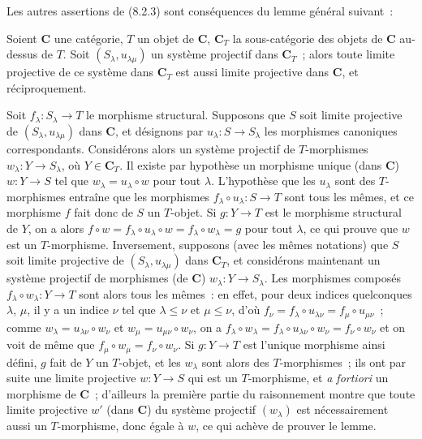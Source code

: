 Les autres assertions de (8.2.3) sont conséquences du lemme général suivant~:

\begin{lemma}[8.2.4]
\label{IV.8.2.4-fr}
Soient $\boldsymbol{C}$ une catégorie, $T$ un objet de $\boldsymbol{C}$,
$\boldsymbol{C}_T$ la sous-catégorie des objets de $\boldsymbol{C}$ au-dessus de $T$.
Soit $(S_\lambda,u_{\lambda\mu})$ un système projectif dans $\boldsymbol{C}_T$~;
alors toute limite projective de ce système dans $\boldsymbol{C}_T$ est aussi
limite projective dans $\boldsymbol{C}$, et réciproquement.
\end{lemma}

Soit $f_\lambda:S_\lambda\to T$ le morphisme structural. Supposons que $S$
soit limite projective de $(S_\lambda,u_{\lambda\mu})$ dans $\boldsymbol{C}$, et
désignons par $u_\lambda:S\to S_\lambda$ les morphismes canoniques
correspondants. Considérons alors un système projectif de $T$-morphismes
$w_\lambda:Y\to S_\lambda$, où $Y\in\boldsymbol{C}_T$. Il existe par hypothèse un
morphisme unique (dans $\boldsymbol{C}$) $w:Y\to S$ tel que
$w_\lambda=u_\lambda\circ w$ pour tout $\lambda$. L'hypothèse que les
$u_\lambda$ sont des $T$-morphismes entraîne que les morphismes
$f_\lambda\circ u_\lambda:S\to T$ sont tous les mêmes, et ce morphisme $f$
fait donc de $S$ un $T$-objet. Si $g:Y\to T$ est le morphisme structural de
$Y$, on a alors
$f\circ w=f_\lambda\circ u_\lambda\circ w=f_\lambda\circ w_\lambda=g$ pour
tout $\lambda$, ce qui prouve que $w$ est un $T$-morphisme. Inversement,
supposons (avec les mêmes notations) que $S$ soit limite projective de
$(S_\lambda,u_{\lambda\mu})$ dans $\boldsymbol{C}_T$, et considérons maintenant un
système projectif de morphismes (de $\boldsymbol{C}$) $w_\lambda:Y\to S_\lambda$.
Les morphismes composés $f_\lambda\circ w_\lambda:Y\to T$ sont alors tous
les mêmes~: en effet, pour deux indices quelconques $\lambda$, $\mu$, il y a
un indice $\nu$ tel que $\lambda\leq\nu$ et $\mu\leq\nu$, d'où
$f_\nu=f_\lambda\circ u_{\lambda\nu}=f_\mu\circ u_{\mu\nu}$~; comme
$w_\lambda=u_{\lambda\nu}\circ w_\nu$ et
$w_\mu=u_{\mu\nu}\circ w_\nu$, on a
$f_\lambda\circ w_\lambda=f_\lambda\circ u_{\lambda\nu}\circ w_\nu
=f_\nu\circ w_\nu$ et on voit de même que
$f_\mu\circ w_\mu=f_\nu\circ w_\nu$. Si $g:Y\to T$ est l'unique morphisme
ainsi défini, $g$ fait de $Y$ un $T$-objet, et les $w_\lambda$ sont alors des
$T$-morphismes~; ils ont par suite une limite projective $w:Y\to S$ qui est
un $T$-morphisme, et \emph{a fortiori} un morphisme de $\boldsymbol{C}$~;
d'ailleurs la première partie du raisonnement montre que toute limite
projective $w'$ (dans $\boldsymbol{C}$) du système projectif $(w_\lambda)$ est
nécessairement aussi un $T$-morphisme, donc égale à $w$, ce qui achève de
prouver le lemme.

